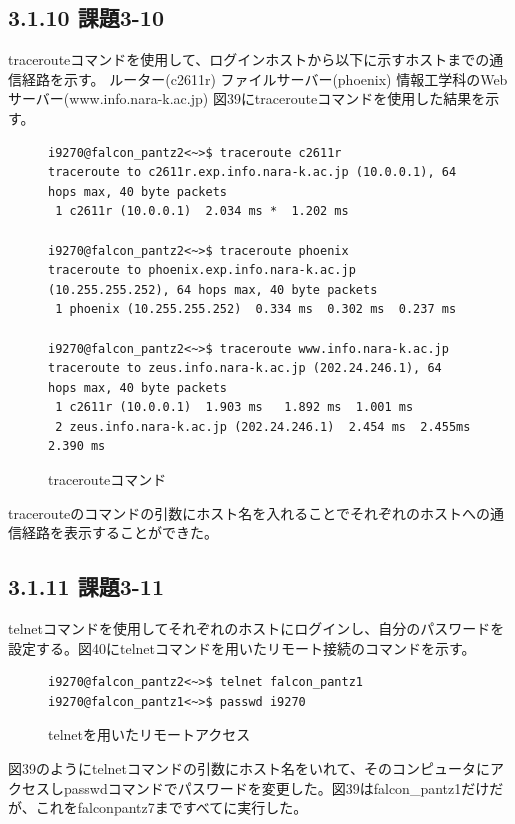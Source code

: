 \documentclass[12pt]{jreport}
\begin{document}
            \subsection*{3.1.10 課題3-10}
                tracerouteコマンドを使用して、ログインホストから以下に示すホストまでの通信経路を示す。
                ルーター(c2611r)
                ファイルサーバー(phoenix)
                情報工学科のWebサーバー(www.info.nara-k.ac.jp)
                図39にtracerouteコマンドを使用した結果を示す。
                \begin{figure}[H]
                    \begin{center}
                        \begin{screen}
                            \begin{verbatim}
i9270@falcon_pantz2<~>$ traceroute c2611r
traceroute to c2611r.exp.info.nara-k.ac.jp (10.0.0.1), 64 hops max, 40 byte packets
 1 c2611r (10.0.0.1)  2.034 ms *  1.202 ms

i9270@falcon_pantz2<~>$ traceroute phoenix
traceroute to phoenix.exp.info.nara-k.ac.jp (10.255.255.252), 64 hops max, 40 byte packets
 1 phoenix (10.255.255.252)  0.334 ms  0.302 ms  0.237 ms

i9270@falcon_pantz2<~>$ traceroute www.info.nara-k.ac.jp
traceroute to zeus.info.nara-k.ac.jp (202.24.246.1), 64 hops max, 40 byte packets
 1 c2611r (10.0.0.1)  1.903 ms   1.892 ms  1.001 ms
 2 zeus.info.nara-k.ac.jp (202.24.246.1)  2.454 ms  2.455ms  2.390 ms
                            \end{verbatim}
                        \end{screen}
                        \caption{tracerouteコマンド}
                        \label{39}
                    \end{center}
                \end{figure}
                tracerouteのコマンドの引数にホスト名を入れることでそれぞれのホストへの通信経路を表示することができた。
            \subsection*{3.1.11 課題3-11}
                telnetコマンドを使用してそれぞれのホストにログインし、自分のパスワードを設定する。図40にtelnetコマンドを用いたリモート接続のコマンドを示す。
                \begin{figure}[H]
                    \begin{center}
                        \begin{screen}
                            \begin{verbatim}
i9270@falcon_pantz2<~>$ telnet falcon_pantz1
i9270@falcon_pantz1<~>$ passwd i9270
                            \end{verbatim}
                        \end{screen}
                        \caption{telnetを用いたリモートアクセス}
                        \label{40}
                    \end{center}
                \end{figure}
                図39のようにtelnetコマンドの引数にホスト名をいれて、そのコンピュータにアクセスしpasswdコマンドでパスワードを変更した。図39はfalcon_pantz1だけだが、これをfalconpantz7まですべてに実行した。
\end{document}
